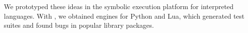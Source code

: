 We prototyped these ideas in the \chef symbolic execution platform for interpreted languages.  With \chef, we obtained engines for Python and Lua, which generated test suites and found bugs in popular library packages.

